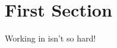 \documentclass{article}
\begin{document}




\section*{First Section}

Working in \LaTex isn't so hard!
\end{document}
